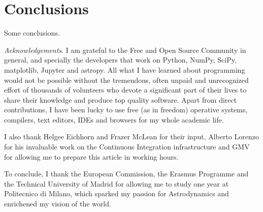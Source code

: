 \section{Conclusions}

Some conclusions.

\footnotesize{\textit{Acknowledgements}. I am grateful to the Free and Open Source Community in general, and specially the developers that work on Python, NumPy, SciPy, matplotlib, Jupyter and astropy. All what I have learned about programming would not be possible without the tremendous, often unpaid and unrecognized effort of thousands of volunteers who devote a significant part of their lives to share their knowledge and produce top quality software. Apart from direct contributions, I have been lucky to use free (as in freedom) operative systems, compilers, text editors, IDEs and browsers for my whole academic life.

I also thank Helgee Eichhorn and Frazer McLean for their input, Alberto Lorenzo for his invaluable work on the Continuous Integration infrastructure and GMV for allowing me to prepare this article in working hours.

To conclude, I thank the European Commission, the Erasmus Programme and the Technical University of Madrid for allowing me to study one year at Politecnico di Milano, which sparked my passion for Astrodynamics and enrichened my vision of the world.
}